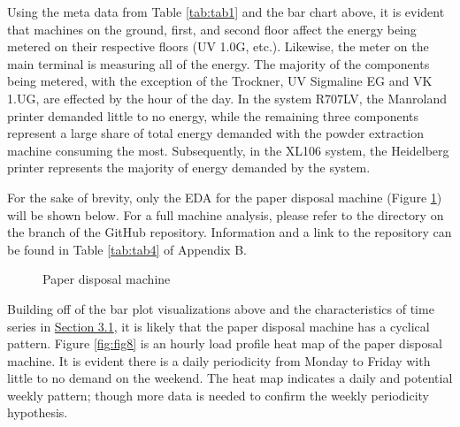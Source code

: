 Using the meta data from Table \ref{tab:tab1} and the bar chart above, it is evident that machines on the ground, first, and second floor affect the energy being metered on their respective floors (UV 1.0G, etc.). Likewise, the meter on the main terminal is measuring all of the energy. The majority of the components being metered, with the exception of the Trockner, UV Sigmaline EG and VK 1.UG, are effected by the hour of the day. In the system R707LV, the Manroland printer demanded little to no energy, while the remaining three components represent a large share of total energy demanded with the powder extraction machine consuming the most. Subsequently, in the XL106 system, the Heidelberg printer represents the majority of energy demanded by the system. 

For the sake of brevity, only the EDA for the paper disposal machine (Figure \ref{fig:fig7}) will be shown below. For a full machine analysis, please refer to the  directory on the  branch of the GitHub repository. Information and a link to the repository can be found in Table \ref{tab:tab4} of Appendix B. 

\begin{figure}[h]
  \centering
  \graphicspath{ {./images/} }
  \hfill
  \caption{Paper disposal machine}
  \label{fig:fig7}
\end{figure}

Building off of the bar plot visualizations above and the characteristics of time series in \hyperlink{subsection.3.1}{Section 3.1}, it is likely that the paper disposal machine has a cyclical pattern. Figure \ref{fig:fig8} is an hourly load profile heat map of the paper disposal machine. It is evident there is a daily periodicity from Monday to Friday with little to no demand on the weekend. The heat map indicates a daily and potential weekly pattern; though more data is needed to confirm the weekly periodicity hypothesis. 

